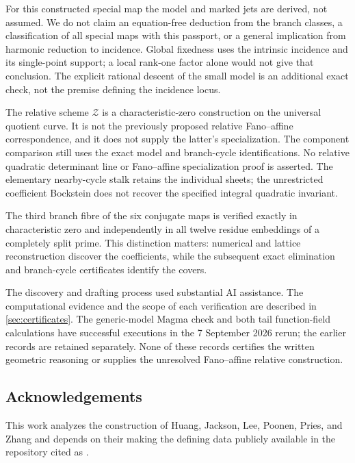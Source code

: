 \documentclass[11pt]{amsart}
\theoremstyle{definition}
\theoremstyle{remark}
\begin{document}
For this constructed special map the model and marked jets are
derived, not assumed.  We do not claim an equation-free deduction
from the branch classes, a classification of all special maps with
this passport, or a general implication from harmonic reduction
to incidence.  Global fixedness uses the intrinsic incidence and
its single-point support; a local rank-one factor alone would not
give that conclusion.  The explicit rational descent of the small
model is an additional exact check, not the premise defining the
incidence locus.

The relative scheme $\mathcal Z$ is a characteristic-zero
construction on the universal quotient curve.
It is not the previously proposed relative Fano--affine
correspondence, and it does not supply the latter's specialization.
The component comparison still uses the exact model and
branch-cycle identifications.
No relative quadratic determinant line or Fano--affine
specialization proof is asserted.
The elementary nearby-cycle stalk retains the individual sheets;
the unrestricted coefficient Bockstein does not recover the
specified integral quadratic invariant.

The third branch fibre of the six conjugate maps is verified exactly in
characteristic zero and independently in all twelve residue embeddings of
a completely split prime.  This distinction matters: numerical and lattice
reconstruction discover the coefficients, while the subsequent exact
elimination and branch-cycle certificates identify the covers.

The discovery and drafting process used substantial AI assistance.
The computational evidence and the scope of each verification are described
in \cref{sec:certificates}.  The generic-model Magma check and both
tail function-field calculations have successful executions in the
7 September 2026 rerun; the earlier records are retained separately.
None of these records certifies the written geometric reasoning or
supplies the unresolved Fano--affine relative construction.

\subsection*{Acknowledgements}

This work analyzes the construction of Huang, Jackson, Lee, Poonen, Pries,
and Zhang and depends on their making the defining data publicly available
in the repository cited as \cite{M23data}.
\end{document}
